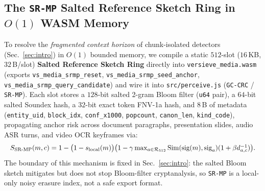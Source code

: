 \documentclass{article}
\begin{document}
\subsection{The \texttt{SR-MP} Salted Reference Sketch Ring in $O(1)$ WASM Memory}
\label{sec:srmp-def}
To resolve the \emph{fragmented context horizon} of chunk-isolated detectors (Sec.~\ref{sec:intro}) in $O(1)$ bounded memory, we compile a static $512$-slot ($16$\,KB, $32$\,B/slot) \textbf{Salted Reference Sketch Ring} directly into \texttt{versieve\_media.wasm} (exports \texttt{vs\_media\_srmp\_reset}, \texttt{vs\_media\_srmp\_seed\_anchor}, \texttt{vs\_media\_srmp\_query\_candidate}) and wire it into \texttt{src/perceive.js} (\texttt{GC-CRC} / \texttt{SR-MP}). Each slot stores a $128$-bit salted 2-gram Bloom filter (\texttt{u64} pair), a $64$-bit salted Soundex hash, a $32$-bit exact token FNV-1a hash, and $8$\,B of metadata (\texttt{entity\_uid}, \texttt{block\_idx}, \texttt{conf\_x1000}, \texttt{popcount}, \texttt{canon\_len}, \texttt{kind\_code}), propagating anchor risk across document paragraphs, presentation slides, audio ASR turns, and video OCR keyframes via:
\begin{equation}
\resizebox{\columnwidth}{!}{$S_{\text{SR-MP}}(m, c) = 1 - \bigl(1 - s_{\text{local}}(m)\bigr)\bigl(1 - \gamma \max_{a \in \mathcal{R}_{512}} \operatorname{Sim}(\text{sig}(m), \text{sig}_a)(1 + \beta d_{a,c}^{-1})\bigr).$}
\end{equation}
The boundary of this mechanism is fixed in Sec.~\ref{sec:intro}: the salted Bloom sketch mitigates but does not stop Bloom-filter cryptanalysis, so \texttt{SR-MP} is a local-only noisy erasure index, not a safe export format.
\end{document}
